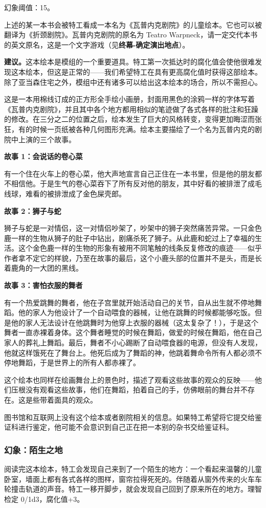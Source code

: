 幻象阈值：15。

上述的某一本书会被特工看成一本名为《瓦普内克剧院》的儿童绘本。它也可以被翻译为《折颈剧院》。瓦普内克剧院的原名为 Teatro Warpneck，请一定交代本书的英文原名，这是一个文字游戏（见\textbf{终幕-确定演出地点}）。

\textbf{建议。}这本绘本是模组的一个重要道具。特工第一次抵达时的腐化值会使他很难发现这本绘本，但这是正常的——我们希望特工在具有更高腐化值时获得这部绘本。除了亚当森住宅之外，模组中还有诸多可以给出这本绘本的场合，所以不需担心。

这是一本用棉线订成的正方形全手绘小画册，封面用黑色的涂鸦一样的字体写着《瓦普内克剧院》，并且其中各个地方都用相似的笔迹做了各式各样的批注和狂躁的修改。在三分之二的位置之后，绘本发生了巨大的风格转变，变得更加晦涩而张狂，有的时候一页纸被各种几何图形充满。绘本主要描绘了一个名为瓦普内克的剧院中上演的三个故事。

\textbf{故事 1：会说话的卷心菜}

有一个住在火车上的卷心菜，他大声地宣言自己正住在一本书里，但是他的朋友都不相信他。于是生气的卷心菜吞下了所有反对他的朋友，其中好看的被排泄了成毛线球，难看的被排泄成了金色屎壳郎。

\textbf{故事 2：狮子与蛇}

狮子与蛇是一对情侣，这一对情侣吵架了，吵架中的狮子突然痛苦异常。一只金色鹿一样的生物从狮子的肚子中钻出，剧痛杀死了狮子。从此鹿和蛇过上了幸福的生活。这个金色鹿一样的生物的形象有被用不同笔触的线条反复修改的痕迹——似乎作者拿不定它的样貌，乃至在故事的最后，这个小鹿头部的位置并不是头，而是长着鹿角的一大团的黑线。

\textbf{故事 3：害怕衣服的舞者}

有一个热爱跳舞的舞者，他在子宫里就开始活动自己的关节，自从出生就不停地舞蹈。他的家人为他设计了一个自动喂食的器械，让他在跳舞的时候都能够吃饭。但是他的家人无法设计在他跳舞时为他穿上衣服的器械（这太复杂了！），于是这个舞者一直赤裸着身体。这个舞者睡觉的时候在舞蹈，做爱的时候在舞蹈，他在自己家人的葬礼上舞蹈。最后，舞者不小心踢断了自动喂食器的电源，但没有人发现，他就这样饿死在了舞台上。他死后成为了舞蹈的神，他跳着舞命令所有人都必须不停地舞蹈，于是世界上的所有人都赤裸了。

这个绘本也同样在绘画舞台上的景色时，描述了观看这些故事的观众的反映——他们压根没有观看这些故事，他们在舞蹈，拍着自己的手，仿佛眼前的舞台并不存在。这是些带着面具的观众。

图书馆和互联网上没有这个绘本或者剧院相关的信息。如果特工希望将它提交给鉴证科进行鉴定，他可能不会意识到自己正在把一本别的杂书交给鉴证科。

\subsubsection{幻象：陌生之地}
阅读完这本绘本，特工会发现自己来到了一个陌生的地方：一个看起来温馨的儿童卧室，墙面上都有各式各样的图样，窗帘拉得死死的。伴随着从窗外传来的火车车轮撞击轨道的声音。特工一移开脚步，就会发现自己回到了原来所在的地方。理智检定 0/1d3，腐化值+3。


